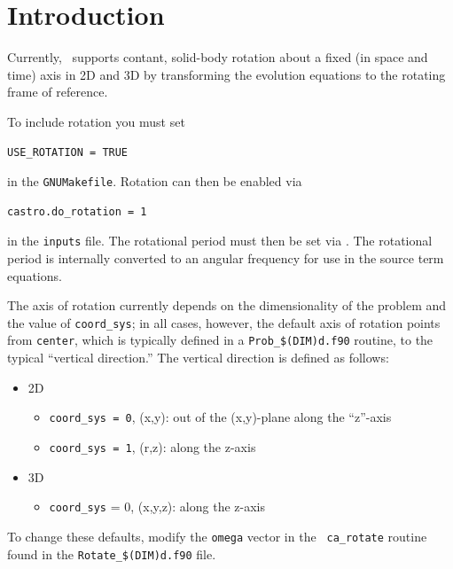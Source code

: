 \label{ch:rotation}

\section{Introduction}

Currently, \castro\ supports contant, solid-body rotation about a fixed
(in space and time) axis in 2D and 3D by transforming the evolution
equations to the rotating frame of reference.

To include rotation you must set
\begin{verbatim}
USE_ROTATION = TRUE
\end{verbatim}
in the {\tt GNUMakefile}.  Rotation can then be enabled via
\begin{verbatim}
castro.do_rotation = 1
\end{verbatim}
in the {\tt inputs} file.  The rotational period must then be set via
.  The rotational period is internally
converted to an angular frequency for use in the source term
equations.

The axis of rotation currently depends on the dimensionality of the
problem and the value of {\tt coord\_sys}; in all cases, however, the
default axis of rotation points from {\tt center}, which is typically
defined in a {\tt Prob\_\$(DIM)d.f90} routine, to the typical ``vertical
direction.''  The vertical direction is defined as follows:
\begin{itemize}
\item 2D
\begin{itemize}
\item {\tt coord\_sys = 0}, (x,y): out of the (x,y)-plane along the ``z''-axis
\item {\tt coord\_sys = 1}, (r,z): along the z-axis
\end{itemize}

\item 3D
\begin{itemize}
\item {\tt coord\_sys} = 0, (x,y,z): along the z-axis
\end{itemize}
\end{itemize}
To change these defaults, modify the {\tt omega} vector in the {\tt
  ca\_rotate} routine found in the {\tt Rotate\_\$(DIM)d.f90} file.


